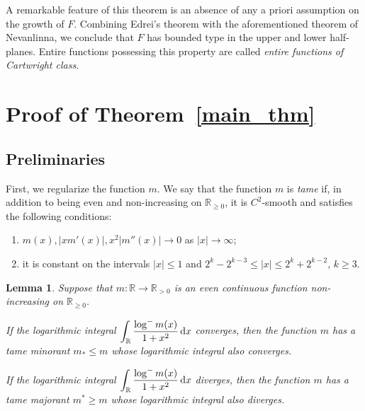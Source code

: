 \documentclass[12pt]{paper}
\newtheorem{lemma}[theorem]{Lemma}
\newcommand{\bR}{\mathbb R}
\begin{document}
A remarkable feature of this theorem is an absence of any a priori 
assumption on the growth of $F$. Combining Edrei's theorem with the aforementioned theorem of Nevanlinna, we conclude that $F$
has bounded type in the upper and lower half-planes. Entire functions possessing this property
are called {\em entire functions of Cartwright class}.

\section{Proof of Theorem~\ref{main_thm}}


\subsection{Preliminaries}
First, we regularize the function $m$. We say that the function $m$ is {\em tame} if, in addition to being even
and non-increasing on $\bR_{\ge 0}$, it is $C^2$-smooth and satisfies the following conditions:
\begin{enumerate}
\item $m(x), |x m'(x)|, x^2|m''(x)|\to 0$ as $|x|\to \infty$;
\item it is constant on the intervals $|x|\le 1$ and $2^k-2^{k-3}\le |x| \le 2^k + 2^{k-2}$, $k\ge 3$.
\end{enumerate}

\begin{lemma}\label{lemmaA}
Suppose that $m\colon \bR \to \bR_{> 0}$ is an even continuous  function non-increasing on
$\bR_{\ge 0}$.

\smallskip{} If the logarithmic integral $\displaystyle \int_\bR \frac{\log^- m(x)}{1+x^2}\, {\rm d}x$ converges, 
then the function $m$ has a tame minorant $m_*\le m$ whose logarithmic integral also converges.

\smallskip{} If the logarithmic integral $\displaystyle \int_\bR \frac{\log^- m(x)}{1+x^2}\, {\rm d}x$ diverges,
then the function $m$ has a tame majorant $m^*\ge m$ whose logarithmic integral also diverges.
\end{lemma}
\end{document}
